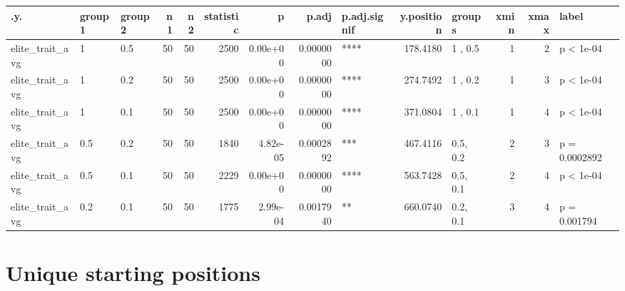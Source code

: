\documentclass[]{book}
\begin{document}
\begin{tabular}{l|l|l|r|r|r|r|r|l|r|l|r|r|l}
\hline
.y. & group1 & group2 & n1 & n2 & statistic & p & p.adj & p.adj.signif & y.position & groups & xmin & xmax & label\\
\hline
elite\_trait\_avg & 1 & 0.5 & 50 & 50 & 2500 & 0.00e+00 & 0.0000000 & **** & 178.4180 & 1  , 0.5 & 1 & 2 & p < 1e-04\\
\hline
elite\_trait\_avg & 1 & 0.2 & 50 & 50 & 2500 & 0.00e+00 & 0.0000000 & **** & 274.7492 & 1  , 0.2 & 1 & 3 & p < 1e-04\\
\hline
elite\_trait\_avg & 1 & 0.1 & 50 & 50 & 2500 & 0.00e+00 & 0.0000000 & **** & 371.0804 & 1  , 0.1 & 1 & 4 & p < 1e-04\\
\hline
elite\_trait\_avg & 0.5 & 0.2 & 50 & 50 & 1840 & 4.82e-05 & 0.0002892 & *** & 467.4116 & 0.5, 0.2 & 2 & 3 & p = 0.0002892\\
\hline
elite\_trait\_avg & 0.5 & 0.1 & 50 & 50 & 2229 & 0.00e+00 & 0.0000000 & **** & 563.7428 & 0.5, 0.1 & 2 & 4 & p < 1e-04\\
\hline
elite\_trait\_avg & 0.2 & 0.1 & 50 & 50 & 1775 & 2.99e-04 & 0.0017940 & ** & 660.0740 & 0.2, 0.1 & 3 & 4 & p = 0.001794\\
\hline
\end{tabular}

\hypertarget{unique-starting-positions-8}{%
\section{Unique starting positions}\label{unique-starting-positions-8}}
\end{document}
